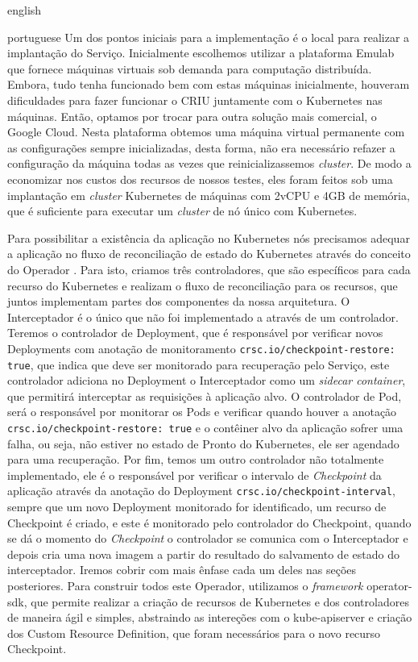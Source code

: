 \begin{otherlanguage*}{english}
\begin{otherlanguage*}{portuguese}
Um dos pontos iniciais para a implementação é o local para realizar a implantação do
Serviço. Inicialmente escolhemos utilizar a plataforma Emulab \cite{White+:osdi02}
que fornece máquinas virtuais sob demanda para computação distribuída. Embora, tudo
tenha funcionado bem com estas máquinas inicialmente, houveram dificuldades para
fazer funcionar o CRIU juntamente com o Kubernetes nas máquinas. Então, optamos por
trocar para outra solução mais comercial, o Google Cloud. Nesta plataforma obtemos
uma máquina virtual permanente com as configurações sempre inicializadas,
desta forma, não era necessário refazer a configuração
da máquina todas as vezes que reinicializassemos \textit{cluster}. De modo a economizar
nos custos dos recursos de nossos testes, eles foram feitos sob uma implantação em
\textit{cluster} Kubernetes de máquinas com 2vCPU e 4GB de memória, que é suficiente
para executar um \textit{cluster} de nó único com Kubernetes.

Para possibilitar a existência da aplicação no Kubernetes nós precisamos adequar a
aplicação no fluxo de reconciliação de estado do Kubernetes através do conceito do Operador
\cite{kubernetes:operator}. Para isto, criamos três controladores, que são específicos para
cada recurso do Kubernetes e realizam o fluxo de reconciliação para os recursos, que juntos
implementam partes dos componentes da nossa arquitetura. O Interceptador é o único que não
foi implementado a através de um controlador. Teremos o controlador de Deployment, que é
responsável por verificar novos Deployments com anotação de monitoramento
\texttt{crsc.io/checkpoint-restore: true}, que indica que deve ser monitorado para
recuperação pelo Serviço, este controlador adiciona no Deployment o Interceptador como
um \textit{sidecar container}, que permitirá interceptar as requisições à aplicação alvo.
O controlador de Pod, será o responsável por monitorar os Pods e verificar quando houver a
anotação \texttt{crsc.io/checkpoint-restore: true} e o contêiner alvo da aplicação sofrer
uma falha, ou seja, não estiver no estado de Pronto do Kubernetes, ele ser agendado para
uma recuperação. Por fim, temos um outro controlador não totalmente
implementado, ele é o responsável por verificar o intervalo de \textit{Checkpoint} da
aplicação através da anotação do Deployment \texttt{crsc.io/checkpoint-interval}, sempre
que um novo Deployment monitorado for identificado, um recurso de Checkpoint é criado, e este
é monitorado pelo controlador do Checkpoint, quando se dá o momento do \textit{Checkpoint}
o controlador se comunica com o Interceptador e depois cria uma nova imagem a partir do
resultado do salvamento de estado do interceptador. Iremos cobrir com mais ênfase cada um
deles nas seções posteriores. Para construir todos este Operador, utilizamos o \textit{framework}
operator-sdk, que permite realizar a criação de recursos de Kubernetes e dos controladores
de maneira ágil e simples, abstraindo as intereções com o kube-apiserver e criação dos
Custom Resource Definition, que foram necessários para o novo recurso Checkpoint.


\end{otherlanguage*}
\end{otherlanguage*}
